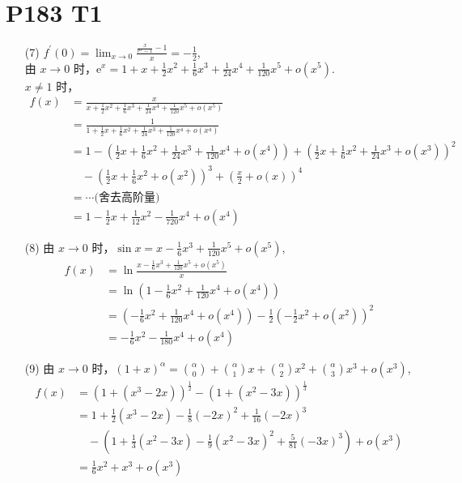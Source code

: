 \documentclass{article}
\newcommand{\ds}{^\prime}
\begin{document}
\section*{P183 T1}

\begin{itemize}
    \item [(7)] $f\ds(0) = \lim_{x \to 0}\frac{\frac{x}{\mathrm{e}^x - 1} - 1}{x} = -\frac{1}{2}$, \\
    由 $x \to 0$ 时，$\mathrm{e}^x = 1 + x + \frac{1}{2}x^2 + \frac{1}{6}x^3 + \frac{1}{24}x^4 + \frac{1}{120}x^5 + o(x^5)$. \\
    $x \neq 1$ 时，
    \begin{align*}
        f(x) & = \frac{x}{x + \frac{1}{2}x^2 + \frac{1}{6}x^3 + \frac{1}{24}x^4 + \frac{1}{120}x^5 + o(x^5)} \\
        & = \frac{1}{1 + \frac{1}{2}x + \frac{1}{6}x^2 + \frac{1}{24}x^3 + \frac{1}{120}x^4 + o(x^4)} \\
        & = 1 - \left(\frac{1}{2}x + \frac{1}{6}x^2 + \frac{1}{24}x^3 + \frac{1}{120}x^4 + o(x^4)\right) + \left(\frac{1}{2}x + \frac{1}{6}x^2 + \frac{1}{24}x^3 + o(x^3)\right)^2 \\
        & \quad - \left(\frac{1}{2}x + \frac{1}{6}x^2 + o(x^2)\right)^3 + \left(\frac{x}{2} + o(x)\right)^4 \\
        & = \cdots \text{(舍去高阶量)} \\
        & = 1 - \frac{1}{2}x + \frac{1}{12}x^2 - \frac{1}{720}x^4 + o(x^4)
    \end{align*}
    \item [(8)] 由 $x \to 0$ 时，$\sin x = x - \frac{1}{6}x^3 + \frac{1}{120}x^5 + o(x^5)$, \\
    \begin{align*}
        f(x) & = \ln \frac{x - \frac{1}{6}x^3 + \frac{1}{120}x^5 + o(x^5)}{x} \\
        & = \ln \left(1 - \frac{1}{6}x^2 + \frac{1}{120}x^4 + o(x^4)\right) \\
        & = \left(- \frac{1}{6}x^2 + \frac{1}{120}x^4 + o(x^4)\right) - \frac{1}{2}\left(-\frac{1}{2}x^2 + o(x^2)\right)^2 \\
        & = -\frac{1}{6}x^2 - \frac{1}{180}x^4 + o(x^4)
    \end{align*}
    \item [(9)] 由 $x \to 0$ 时，$(1 + x)^\alpha = \binom{\alpha}{0} + \binom{\alpha}{1}x + \binom{\alpha}{2}x^2 + \binom{\alpha}{3}x^3 + o(x^3) $, \\
    \begin{align*}
        f(x) & = (1 + (x^3 - 2x))^{\frac{1}{2}} - (1 + (x^2 - 3x))^{\frac{1}{3}} \\
        & = 1 + \frac{1}{2}(x^3 - 2x) - \frac{1}{8}(-2x)^2 + \frac{1}{16}(-2x)^3 \\
        & \quad - \left(1 + \frac{1}{3}(x^2 - 3x) - \frac{1}{9}(x^2 - 3x)^2 + \frac{5}{81}(-3x)^3\right) + o(x^3)\\
        & = \frac{1}{6}x^2 + x^3 + o(x^3)
    \end{align*}
\end{itemize}
\end{document}
